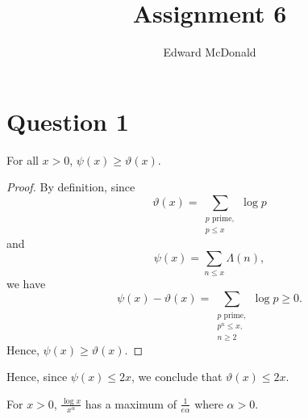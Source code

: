 \documentclass{unswmaths}
\begin{document}
\subject{Number Theory}
\author{Edward McDonald}
\title{Assignment 6}


\setlength\parindent{0pt}

\newcommand{\Unit}{\mathbb{U}}
\newcommand{\modulo}[1]{\;\operatorname{mod}\;#1}
\newcommand{\pprime}{{p\text{ prime}}}

\unswtitle{}


\section*{Question 1}
\begin{lemma}
    For all $x > 0$, $\psi(x) \geq \vartheta(x)$.
\end{lemma}
\begin{proof}
    By definition, since
    \begin{equation*}
        \vartheta(x) = \sum_{\substack{\pprime,\\ p \leq x}} \log{p}
    \end{equation*}
    and
    \begin{equation*}
        \psi(x) = \sum_{n \leq x} \Lambda(n),
    \end{equation*}
    we have
    \begin{equation*}
        \psi(x) - \vartheta(x) = \sum_{\substack{\pprime,\\ p^n \leq x,\\ n \geq 2}} \log{p} \geq 0.
    \end{equation*}
    Hence, $\psi(x) \geq \vartheta(x)$.
\end{proof}
Hence, since $\psi(x) \leq 2x$, we conclude that $\vartheta(x) \leq 2x$.
\begin{lemma}
\label{logInequality}
    For $x > 0$, $\frac{\log{x}}{x^\alpha}$ has a maximum of $\frac{1}{e\alpha}$ where $\alpha > 0$. 
\end{lemma}
\end{document}
